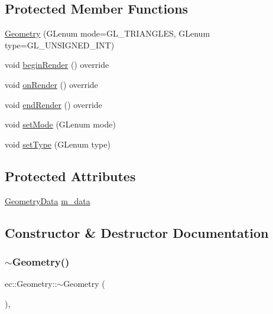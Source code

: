 \subsection*{Protected Member Functions}
\begin{DoxyCompactItemize}
\item 
\mbox{\hyperlink{classec_1_1_geometry_aeae22c6b54c7c534249ee08b3fb77a70}{Geometry}} (G\+Lenum mode=G\+L\+\_\+\+T\+R\+I\+A\+N\+G\+L\+ES, G\+Lenum type=G\+L\+\_\+\+U\+N\+S\+I\+G\+N\+E\+D\+\_\+\+I\+NT)
\item 
void \mbox{\hyperlink{classec_1_1_geometry_aeca5f0e52e7c2e4b352ede1a6e7c3f5b}{begin\+Render}} () override
\item 
void \mbox{\hyperlink{classec_1_1_geometry_a1f166e70fc880e88092f29ef46afb836}{on\+Render}} () override
\item 
void \mbox{\hyperlink{classec_1_1_geometry_ae0352702162501df185517e84c3b02bd}{end\+Render}} () override
\item 
void \mbox{\hyperlink{classec_1_1_geometry_ad4f80cd4d4c22b108c33b9030e91467b}{set\+Mode}} (G\+Lenum mode)
\item 
void \mbox{\hyperlink{classec_1_1_geometry_a12c3da280ff11e86a8b07d18a23e0880}{set\+Type}} (G\+Lenum type)
\end{DoxyCompactItemize}
\subsection*{Protected Attributes}
\begin{DoxyCompactItemize}
\item 
\mbox{\hyperlink{structec_1_1_geometry_data}{Geometry\+Data}} \mbox{\hyperlink{classec_1_1_geometry_aeb72a472b242d92496f0283cfee17fac}{m\+\_\+data}}
\end{DoxyCompactItemize}


\subsection{Constructor \& Destructor Documentation}
\mbox{\label{classec_1_1_geometry_a964c581313da2be51a3c78d3be7f48b3}} 
\subsubsection{\texorpdfstring{$\sim$\+Geometry()}{~Geometry()}}
{\footnotesize\ttfamily ec\+::\+Geometry\+::$\sim$\+Geometry (\begin{DoxyParamCaption}{ }\end{DoxyParamCaption})\hspace{0.3cm}{\ttfamily [virtual]}, {\ttfamily [default]}}

